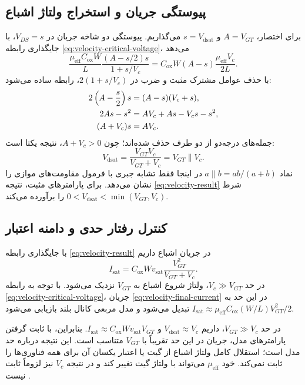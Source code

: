 \subsection*{پیوستگی جریان و استخراج ولتاژ اشباع}
برای اختصار، \(A=V_{GT}\) و \(s=V_{\mathrm{dsat}}\) می‌گذاریم.
پیوستگی دو شاخه جریان در \(V_{DS}=s\)، با جایگذاری رابطه \eqref{eq:velocity-critical-voltage}، می‌دهد
\begin{equation}
 \frac{\mu_{\mathrm{eff}}C_{\mathrm{ox}}W}{L}
 \frac{(A-s/2)s}{1+s/V_c}
 =C_{\mathrm{ox}}W(A-s)\frac{\mu_{\mathrm{eff}}V_c}{2L}.
 \label{eq:velocity-continuity}
\end{equation}
با حذف عوامل مشترک مثبت و ضرب در \(2(1+s/V_c)\)، رابطه ساده می‌شود:
\begin{align}
 2\left(A-\frac{s}{2}\right)s&=(A-s)(V_c+s),\notag\\
 2As-s^2&=AV_c+As-V_cs-s^2,\notag\\
 (A+V_c)s&=AV_c.
 \label{eq:velocity-algebra}
\end{align}
جمله‌های درجه‌دو از دو طرف حذف شده‌اند؛ چون \(A+V_c>0\)، نتیجه یکتا است:
\begin{equation}
 \boxed{V_{\mathrm{dsat}}=\frac{V_{GT}V_c}{V_{GT}+V_c}
 =V_{GT}\parallel V_c.}
 \label{eq:velocity-result}
\end{equation}
نماد \(a\parallel b=ab/(a+b)\) در اینجا فقط تشابه جبری با فرمول مقاومت‌های موازی را نشان می‌دهد.
برای پارامترهای مثبت، نتیجه \eqref{eq:velocity-result} شرط
\(0<V_{\mathrm{dsat}}<\min(V_{GT},V_c)\) را برآورده می‌کند.

\subsection*{کنترل رفتار حدی و دامنه اعتبار}
با جایگذاری رابطه \eqref{eq:velocity-result} در جریان اشباع داریم
\cite[رابطه ]{weste}
\begin{equation}
 I_{\mathrm{sat}}=C_{\mathrm{ox}}Wv_{\mathrm{sat}}
 \frac{V_{GT}^2}{V_{GT}+V_c}.
 \label{eq:velocity-final-current}
\end{equation}
در حد \(V_c\gg V_{GT}\)، ولتاژ شروع اشباع به \(V_{GT}\) نزدیک می‌شود.
با توجه به رابطه \eqref{eq:velocity-critical-voltage}، جریان \eqref{eq:velocity-final-current} در این حد به
\(I_{\mathrm{sat}}\approx\mu_{\mathrm{eff}}C_{\mathrm{ox}}(W/L)V_{GT}^2/2\)
تبدیل می‌شود و مدل مربعی کانال بلند بازیابی می‌شود.

در حد \(V_{GT}\gg V_c\)، داریم
\(V_{\mathrm{dsat}}\approx V_c\) و
\(I_{\mathrm{sat}}\approx C_{\mathrm{ox}}Wv_{\mathrm{sat}}V_{GT}\).
بنابراین، با ثابت گرفتن پارامترهای مدل، جریان در این حد تقریباً با \(V_{GT}\) متناسب است.
این نتیجه درباره حد مدل است؛ استقلال کامل ولتاژ اشباع از گیت یا اعتبار یکسان آن برای همه فناوری‌ها را ثابت نمی‌کند.
خود \(\mu_{\mathrm{eff}}\) می‌تواند با ولتاژ گیت تغییر کند و در نتیجه \(V_c\) نیز لزوماً ثابت نیست
\cite[صفحه چاپی ۷۷]{weste}.
